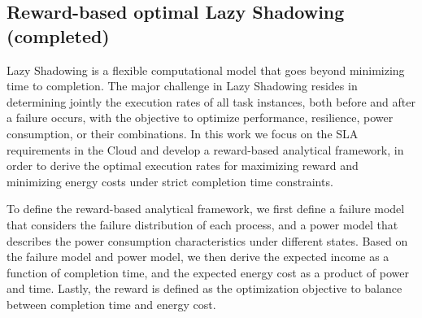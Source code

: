 


\subsection{Reward-based optimal Lazy Shadowing (completed)}
Lazy Shadowing is a flexible computational model that goes beyond minimizing time to completion. 
The major challenge in Lazy Shadowing resides in determining jointly the execution rates of all task instances, 
both before and after a failure occurs, with the objective to optimize performance, resilience, power consumption, or their combinations.
In this work we focus on the SLA requirements in the Cloud and develop a reward-based analytical framework, in order to derive the optimal execution rates for maximizing reward and minimizing energy 
costs under strict completion time constraints. 

To define the reward-based analytical framework, we first define a failure model that considers the failure distribution of each process, and a power model that describes the power consumption characteristics under different states. Based on the failure model and power model, we then derive the expected income as a function of completion time, and the expected energy cost as a product of power and time. Lastly, the reward is defined as the optimization objective to balance between completion time and energy cost.  




